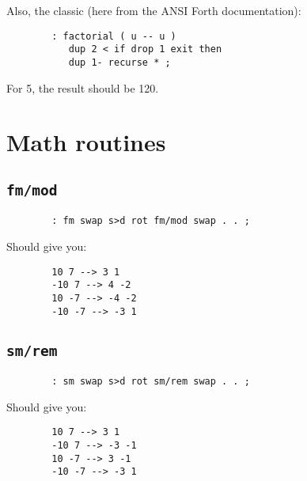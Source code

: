 Also, the classic (here from the ANSI Forth documentation):

\begin{lstlisting}
        : factorial ( u -- u ) 
           dup 2 < if drop 1 exit then 
           dup 1- recurse * ;
\end{lstlisting}

\noindent For 5, the result should be 120.



\section{Math routines}



\subsection{\texttt{fm/mod}}

\begin{lstlisting}
        : fm swap s>d rot fm/mod swap . . ; 
\end{lstlisting}

\noindent Should give you: 
\begin{lstlisting}
        10 7 --> 3 1
        -10 7 --> 4 -2 
        10 -7 --> -4 -2
        -10 -7 --> -3 1
\end{lstlisting}


\subsection{\texttt{sm/rem}}

\begin{lstlisting}
        : sm swap s>d rot sm/rem swap . . ; 
\end{lstlisting}

\noindent Should give you: 
\begin{lstlisting}
        10 7 --> 3 1
        -10 7 --> -3 -1 
        10 -7 --> 3 -1
        -10 -7 --> -3 1
\end{lstlisting}
